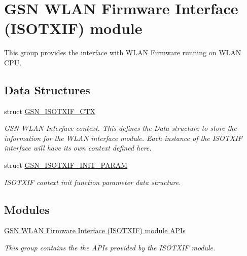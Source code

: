 \hypertarget{a00625}{
\section{GSN WLAN Firmware Interface (ISOTXIF) module}
\label{a00625}
}


This group provides the interface with WLAN Firmware running on WLAN CPU.  


\subsection*{Data Structures}
\begin{DoxyCompactItemize}
\item 
struct \hyperlink{a00105}{GSN\_\-ISOTXIF\_\-CTX}
\begin{DoxyCompactList}\small\item\em GSN WLAN Interface context. This defines the Data structure to store the information for the WLAN interface module. Each instance of the ISOTXIF interface will have its own context defined here. \end{DoxyCompactList}\item 
struct \hyperlink{a00106}{GSN\_\-ISOTXIF\_\-INIT\_\-PARAM}
\begin{DoxyCompactList}\small\item\em ISOTXIF context init function parameter data structure. \end{DoxyCompactList}\end{DoxyCompactItemize}
\subsection*{Modules}
\begin{DoxyCompactItemize}
\item 
\hyperlink{a00626}{GSN WLAN Firmware Interface (ISOTXIF) module APIs}


\begin{DoxyCompactList}\small\item\em This group contains the the APIs provided by the ISOTXIF module. \end{DoxyCompactList}

\end{DoxyCompactItemize}
